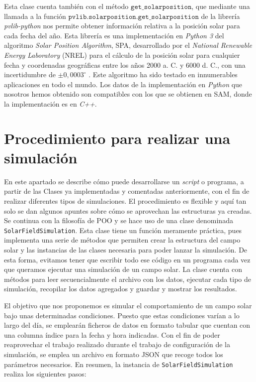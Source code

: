 Esta clase cuenta también con el  método $\texttt{get\_solarposition}$, que mediante una llamada a la función $\texttt{pvlib.solarposition.get\_solarposition}$ de la librería \emph{pvlib-python} nos permite obtener información relativa a la posición solar para cada fecha del año. Esta librería es una implementación en \emph{Python 3} del algoritmo  \emph{Solar Position Algorithm}, SPA,  desarrollado por el \emph{National Renewable Energy Laboratory} (NREL) para el cálculo de la posición solar para cualquier fecha y coordenadas geográficas entre los años 2000 a. C. y 6000 d. C., con una incertidumbre de $\pm 0,0003^\circ$ \cite{redaSolarPositionAlgorithm2008}. Este algoritmo ha sido testado en innumerables aplicaciones en todo el mundo. Los datos de la implementación en \emph{Python} que nosotros hemos obtenido son compatibles con los que se obtienen en SAM,  donde la implementación es en \emph{C++}.


\section{Procedimiento para realizar una simulación}

En este apartado se describe cómo puede desarrollarse un \emph{script} o programa, a partir de las Clases ya implementadas y comentadas anteriormente, con el fin de realizar diferentes tipos de simulaciones. El procedimiento es flexible y aquí tan solo se dan algunos apuntes sobre cómo se aprovechan las estructuras ya creadas. Se continua con la filosofía de POO y se hace uso de una clase denominada \texttt{SolarFieldSimulation}. Esta clase tiene un función meramente práctica, pues implementa una serie de métodos que permiten crear la estructura del campo solar y las instancias de las clases necesaria para poder lanzar la simulación. De esta forma, evitamos tener que escribir todo ese código en un programa cada vez que queramos ejecutar una simulación de un campo solar. La clase cuenta con métodos para leer secuencialmente el archivo con los datos, ejecutar cada tipo de simulación, recopilar los datos agregados y guardar y mostrar los resultados.

El objetivo que nos proponemos es simular el comportamiento de un campo solar bajo unas determinadas condiciones. Puesto que estas condiciones varían a lo largo del día, se emplearán ficheros de datos en formato tabular que cuentan con una columna índice para la fecha y hora indicadas. Con el fin de poder reaprovechar el trabajo realizado durante el trabajo de configuración de la simulación, se emplea un archivo en formato JSON que recoge todos los parámetros necesarios. En resumen, la instancia de \texttt{SolarFieldSimulation} realiza los siguientes pasos:

